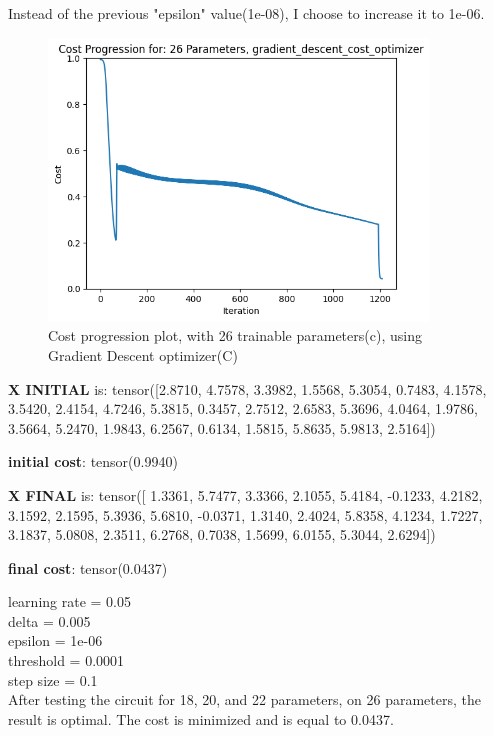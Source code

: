 \documentclass[inscr,ack,preface]{diphdthesis}
\begin{document}
\begin{enumerate}[label=\textbf{\Alph*.}]
    Instead of the previous "epsilon" value(1e-08), I choose to increase it to 1e-06.
    
    \begin{figure}[H]
        \centering
        \includegraphics[width=0.9\textwidth]{epsilon06/26.png}
        \caption{Cost progression plot, with 26 trainable parameters(c), using Gradient Descent optimizer(C)} 
        \label{fig:fig3}
    \end{figure}
    
    \textbf{X INITIAL} is:
    tensor([2.8710, 4.7578, 3.3982, 1.5568, 5.3054, 0.7483, 4.1578, 3.5420, 2.4154,
            4.7246, 5.3815, 0.3457, 2.7512, 2.6583, 5.3696, 4.0464, 1.9786, 3.5664,
            5.2470, 1.9843, 6.2567, 0.6134, 1.5815, 5.8635, 5.9813, 2.5164])
            
    \textbf{initial cost}: tensor(0.9940)
    
    \textbf{X FINAL} is:
    tensor([ 1.3361,  5.7477,  3.3366,  2.1055,  5.4184, -0.1233,  4.2182,  3.1592,
             2.1595,  5.3936,  5.6810, -0.0371,  1.3140,  2.4024,  5.8358,  4.1234,
             1.7227,  3.1837,  5.0808,  2.3511,  6.2768,  0.7038,  1.5699,  6.0155,
             5.3044,  2.6294])
             
    \textbf{final cost}: tensor(0.0437)

    learning rate =  0.05 \\
    delta =  0.005 \\
    epsilon =  1e-06 \\
    threshold =  0.0001\\ 
    step size =  0.1 \\
    
    After testing the circuit for 18, 20, and 22 parameters, on 26 parameters, the result is optimal. The cost is minimized and is equal to 0.0437.
    
\end{enumerate}
\end{document}
